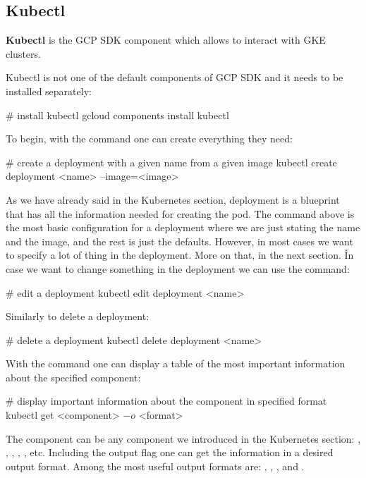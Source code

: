 
\subsection{Kubectl}

\bd[Kubectl]
\textbf{Kubectl} is the GCP SDK component which allows to interact with GKE clusters.
\ed

Kubectl is not one of the default components of GCP SDK and it needs to be installed separately:
\begin{bash}
# install kubectl
gcloud components install kubectl
\end{bash}

To begin, with the  command one can create everything they need:
\begin{bash}
# create a deployment with a given name from a given image
kubectl create deployment <name> --image=<image>
\end{bash}

As we have already said in the Kubernetes section, deployment is a blueprint that has all the information needed for
creating the pod. The command above is the most basic configuration for a deployment where we are just stating the
name and the image, and the rest is just the defaults. However, in most cases we want to specify a lot of thing in
the deployment. More on that, in the next section. \v

In case we want to change something in the deployment we can use the  command:
\begin{bash}
# edit a deployment
kubectl edit deployment <name>
\end{bash}

Similarly to delete a deployment:
\begin{bash}
# delete a deployment
kubectl delete deployment <name>
\end{bash}

With the  command one can display a table of the most important information about the specified
component:
\begin{bash}
# display important information about the component in specified format
kubectl get <component> $-o$ <format>
\end{bash}

The component can be any component we introduced in the Kubernetes section: , , ,
, , etc. Including the output flag  one can get the information in a
desired output format. Among the most useful output formats are: , , ,
 and .

